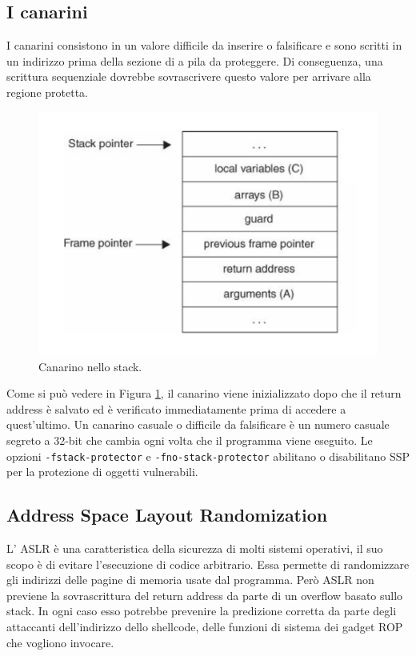 \subsection{I canarini}
 I canarini consistono in un valore difficile da inserire o falsificare e sono scritti in un indirizzo prima della sezione di a pila da proteggere.  Di conseguenza, una scrittura sequenziale dovrebbe sovrascrivere questo valore per arrivare alla regione protetta.
\begin{figure}[H]
	\centering
    \includegraphics[width=12cm, keepaspectratio]{santini/img/cap_3/canarini.png}
	\caption{Canarino nello stack.}\label{fig:canarini}
\end{figure}
Come si può vedere in Figura \ref{fig:canarini}, il canarino viene inizializzato dopo che il return address è salvato ed è verificato immediatamente prima di accedere a quest'ultimo. Un canarino casuale o difficile da falsificare è un numero casuale segreto a 32-bit che cambia ogni volta che il programma viene eseguito. Le opzioni \verb|-fstack-protector| e \verb|-fno-stack-protector| abilitano o disabilitano SSP per la protezione di oggetti vulnerabili.
\subsection{Address Space Layout Randomization}
L' ASLR è una caratteristica della sicurezza di molti sistemi operativi, il suo scopo è di evitare l'esecuzione di codice arbitrario. Essa permette di randomizzare gli indirizzi delle pagine di memoria usate dal programma. Però ASLR non previene la sovrascrittura del return address da parte di un overflow basato sullo stack. In ogni caso esso potrebbe prevenire la predizione corretta da parte degli attaccanti dell'indirizzo dello shellcode, delle funzioni di sistema dei gadget ROP che vogliono invocare.


